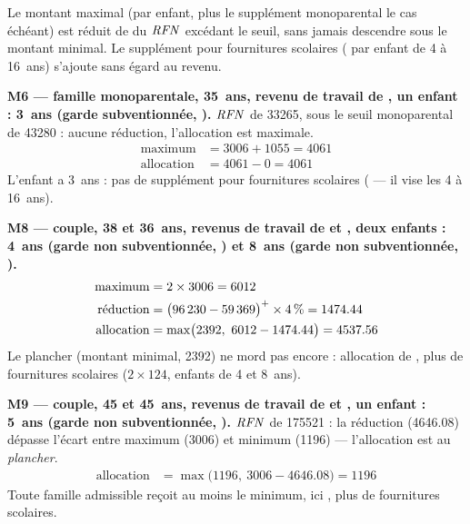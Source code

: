 \pexemples Le montant maximal (par enfant, plus le supplément monoparental le cas
échéant) est réduit de  du $\mathit{RFN}$ excédant le seuil,
sans jamais descendre sous le montant minimal. Le supplément pour fournitures
scolaires ( par enfant de 4 à 16~ans) s'ajoute
sans égard au revenu.

\medskip\noindent\textbf{M6 --- famille monoparentale, 35~ans, revenu de travail de , un enfant : 3~ans (garde subventionnée, ).}
$\mathit{RFN}$ de \num{33265}, sous le seuil monoparental de \num{43280} :
aucune réduction, l'allocation est maximale.
\begin{align*}
\text{maximum} &= \num{3006} + \num{1055} = \num{4061} \\
\text{allocation} &= \num{4061} - 0 = \num{4061}
\end{align*}
L'enfant a 3~ans : pas de supplément pour fournitures scolaires
( — il vise les 4 à 16~ans).

\medskip\noindent\textbf{M8 --- couple, 38 et 36~ans, revenus de travail de  et , deux enfants : 4~ans (garde non subventionnée, ) et 8~ans (garde non subventionnée, ).}
\begin{align*}
\text{maximum} &= 2 \times \num{3006} = \num{6012} \\
\text{réduction} &= \bigl(\num{96230} - \num{59369}\bigr)^{+} \times \num{4}\,\% = \num{1474.44} \\
\text{allocation} &= \max\bigl(\num{2392},\ \num{6012} - \num{1474.44}\bigr) = \num{4537.56}
\end{align*}
Le plancher (montant minimal, \num{2392}) ne mord pas encore :
allocation de , plus  de fournitures scolaires
($2 \times \num{124}$, enfants de 4 et 8~ans).

\medskip\noindent\textbf{M9 --- couple, 45 et 45~ans, revenus de travail de  et , un enfant : 5~ans (garde non subventionnée, ).}
$\mathit{RFN}$ de \num{175521} : la réduction (\num{4646.08}) dépasse
l'écart entre maximum (\num{3006}) et minimum (\num{1196}) —
l'allocation est au \emph{plancher}.
\begin{align*}
\text{allocation} &= \max\bigl(\num{1196},\ \num{3006} - \num{4646.08}\bigr) = \num{1196}
\end{align*}
Toute famille admissible reçoit au moins le minimum, ici ,
plus  de fournitures scolaires.
